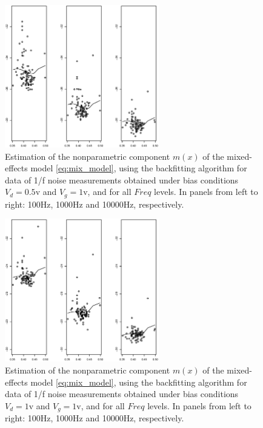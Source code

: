 \documentclass[sn-mathphys]{sn-jnl}%
\theoremstyle{thmstyleone}%
\theoremstyle{thmstyletwo}%
\theoremstyle{thmstylethree}%
\begin{document}
\begin{figure}[ht]
	\centerline{\includegraphics [width=0.6\textwidth]{Fig10_elognoise_d05g1.eps}}
	\caption{Estimation of the nonparametric component $m(x)$ of the mixed-effects model \eqref{eq:mix_model}, using the backfitting algorithm for data of 1/f noise measurements obtained under bias conditions $V_d=0.5$v and $V_g=1$v, and for all $Freq$ levels. In panels from left to right: 100Hz, 1000Hz and 10000Hz, respectively.}
	\label{fig:backfit3}
\end{figure}
\begin{figure}[ht]
	\centerline{\includegraphics [width=0.6\textwidth]{Fig11_elognoise_d1g1.eps}}
	\caption{Estimation of the nonparametric component $m(x)$ of the mixed-effects model \eqref{eq:mix_model}, using the backfitting algorithm for data of 1/f noise measurements obtained under bias conditions $V_d=1$v and $V_g=1$v, and for all $Freq$ levels. In panels from left to right: 100Hz, 1000Hz and 10000Hz, respectively.}
	\label{fig:backfit4}
\end{figure}



\end{document}
